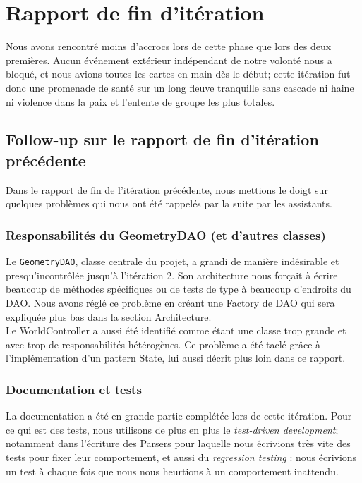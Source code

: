\section{Rapport de fin d'itération}

Nous avons rencontré moins d'accrocs lors de cette phase que lors des deux premières. 
Aucun événement extérieur indépendant de notre volonté nous a bloqué, et nous 
avions toutes les cartes en main dès le début; cette itération fut donc une 
promenade de santé sur un long fleuve tranquille sans cascade ni haine ni 
violence dans la paix et l'entente de groupe les plus totales.


\subsection{Follow-up sur le rapport de fin d'itération précédente}
Dans le rapport de fin de l'itération précédente, nous mettions le doigt sur 
quelques problèmes qui nous ont été rappelés par la suite par les assistants.

	\subsubsection{Responsabilités du GeometryDAO (et d'autres classes)}
	Le \texttt{GeometryDAO}, classe centrale du projet, a grandi de manière 
	indésirable et presqu'incontrôlée jusqu'à l'itération 2. Son architecture 
	nous forçait à écrire beaucoup de méthodes spécifiques ou de tests de type 
	à beaucoup d'endroits du DAO. Nous avons réglé ce problème en créant une 
	Factory de DAO qui sera expliquée plus bas dans la section Architecture.\\

	Le WorldController a aussi été identifié comme étant une classe trop grande 
	et avec trop de responsabilités hétérogènes. Ce problème a été taclé grâce 
	à l'implémentation d'un pattern State, lui aussi décrit plus loin dans ce 
	rapport.

	\subsubsection{Documentation et tests}
	La documentation a été en grande partie complétée lors de cette itération. 
	Pour ce qui est des tests, nous utilisons de plus en plus le 
	\textit{test-driven development}; notamment dans l'écriture des Parsers pour 
	laquelle nous écrivions très vite des tests pour fixer leur comportement, 
	et aussi du \textit{regression testing} : nous écrivions un test à chaque 
	fois que nous nous heurtions à un comportement inattendu.

